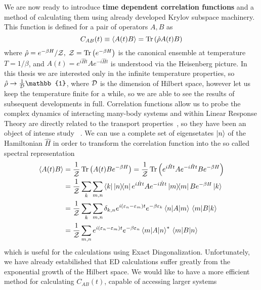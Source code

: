 We are now ready to introduce \textbf{time dependent correlation functions} and a method of calculating them using already
developed Krylov subspace machinery. This function is defined for a pair of operators \(A,B\) as
\begin{equation}
C_{AB}(t) \equiv \langle A(t) B \rangle =  \Tr\left(\hat{\rho}A(t)B\right)
\end{equation}
where \(\hat{\rho} = e^{-\beta H}/\mathcal{Z},\; \mathcal{Z} = \Tr\left(e^{-\beta H}\right)\) is the canonical ensemble at temperature \(T = 1/\beta\),
and \(A(t) = e^{i \hat{H} t} A e^{-i \hat{H} t}\) is understood via the Heisenberg picture. In this thesis we are
interested only in the infinite temperature properties, so \(\hat{\rho} \to \frac{1}{\dimension} \mathbb{1}\), where \(\mathcal{D}\) is 
the dimension of Hilbert space, however let us keep the temperature finite for a while, so we are able to see the results of subsequent
developments in full. Correlation functions allow us to probe the complex dynamics of interacting many-body
systems and within Linear Response Theory are directly related to the transport properties~\autocite{Mahan2000}, so
they have been an object of intense study
~\autocite{Steinigeweg2014,Sirker2009,Steinigeweg2009,Karrasch2013a,Karrasch2012,Steinigeweg2015,Richter2019}.
We can use a complete set of eigensetates \(\ket{n}\) of the Hamiltonian \(\hat{H}\) in order to transform
the correlation function into the so called spectral representation
\begin{align}
	\langle A(t) B \rangle &=  \frac{1}{\mathcal{Z}}\Tr\left(A(t)B e^{-\beta H}\right) = \frac{1}{\mathcal{Z}}\Tr\left(e^{i \hat{H} t} A e^{-i \hat{H} t}B e^{-\beta H}\right)\nonumber\\
	&= \frac{1}{\mathcal{Z}} \sum_k \sum_{m,n} \bra{k} \ketbra{n}{n} e^{i \hat{H} t} A e^{-i \hat{H} t} \ketbra{m}{m} B e^{-\beta H} \ket{k}  \nonumber \\
	&= \frac{1}{\mathcal{Z}} \sum_k \sum_{m,n} \delta_{k,n} e^{i (\varepsilon_n  - \varepsilon_m) t} e^{-\beta \varepsilon_k} \matrixel{n}{A}{m} \matrixel{m}{B}{k} \nonumber \\
	&= \frac{1}{\mathcal{Z}} \sum_{m,n} e^{i (\varepsilon_n  - \varepsilon_m) t} e^{-\beta \varepsilon_n}\matrixel{m}{A}{n}^{\ast} \matrixel{m}{B}{n}
\end{align}
which is useful for the calculations using Exact Diagonalization. Unfortunately, we have already estabilished that ED calculations
suffer greatly from the exponential growth of the Hilbert space.
We would like to have a more efficient method for calculating \(C_{AB}(t)\), capable of accessing larger systems
